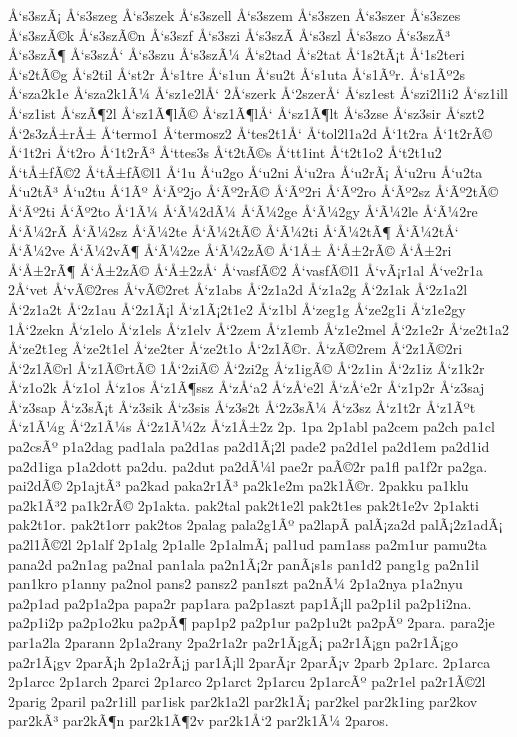 {Å‘s3szÃ¡
Å‘s3szeg
Å‘s3szek
Å‘s3szell
Å‘s3szem
Å‘s3szen
Å‘s3szer
Å‘s3szes
Å‘s3szÃ©k
Å‘s3szÃ©n
Å‘s3szf
Å‘s3szi
Å‘s3szÃ­
Å‘s3szl
Å‘s3szo
Å‘s3szÃ³
Å‘s3szÃ¶
Å‘s3szÅ‘
Å‘s3szu
Å‘s3szÃ¼
Å‘s2tad
Å‘s2tat
Å‘1s2tÃ¡t
Å‘1s2teri
Å‘s2tÃ©g
Å‘s2til
Å‘st2r
Å‘s1tre
Å‘s1un
Å‘su2t
Å‘s1uta
Å‘s1Ãºr.
Å‘s1Ãº2s
Å‘sza2k1e
Å‘sza2k1Ã¼
Å‘sz1e2lÅ‘
2Å‘szerk
Å‘2szerÅ‘
Å‘sz1est
Å‘szi2l1i2
Å‘sz1ill
Å‘sz1ist
Å‘szÃ¶2l
Å‘sz1Ã¶lÃ©
Å‘sz1Ã¶lÅ‘
Å‘sz1Ã¶lt
Å‘s3zse
Å‘sz3sir
Å‘szt2
Å‘2s3zÅ±rÅ±
Å‘termo1
Å‘termosz2
Å‘tes2t1Å‘
Å‘tol2l1a2d
Å‘1t2ra
Å‘1t2rÃ©
Å‘1t2ri
Å‘t2ro
Å‘1t2rÃ³
Å‘ttes3s
Å‘t2tÃ©s
Å‘tt1int
Å‘t2t1o2
Å‘t2t1u2
Å‘tÅ±fÃ©2
Å‘tÅ±fÃ©l1
Å‘1u
Å‘u2go
Å‘u2ni
Å‘u2ra
Å‘u2rÃ¡
Å‘u2ru
Å‘u2ta
Å‘u2tÃ³
Å‘u2tu
Å‘1Ãº
Å‘Ãº2jo
Å‘Ãº2rÃ©
Å‘Ãº2ri
Å‘Ãº2ro
Å‘Ãº2sz
Å‘Ãº2tÃ©
Å‘Ãº2ti
Å‘Ãº2to
Å‘1Ã¼
Å‘Ã¼2dÃ¼
Å‘Ã¼2ge
Å‘Ã¼2gy
Å‘Ã¼2le
Å‘Ã¼2re
Å‘Ã¼2rÃ­
Å‘Ã¼2sz
Å‘Ã¼2te
Å‘Ã¼2tÃ©
Å‘Ã¼2ti
Å‘Ã¼2tÃ¶
Å‘Ã¼2tÅ‘
Å‘Ã¼2ve
Å‘Ã¼2vÃ¶
Å‘Ã¼2ze
Å‘Ã¼2zÃ©
Å‘1Å±
Å‘Å±2rÃ©
Å‘Å±2ri
Å‘Å±2rÃ¶
Å‘Å±2zÃ©
Å‘Å±2zÅ‘
Å‘vasfÃ©2
Å‘vasfÃ©l1
Å‘vÃ¡r1al
Å‘ve2r1a
2Å‘vet
Å‘vÃ©2res
Å‘vÃ©2ret
Å‘z1abs
Å‘2z1a2d
Å‘z1a2g
Å‘2z1ak
Å‘2z1a2l
Å‘2z1a2t
Å‘2z1au
Å‘2z1Ã¡l
Å‘z1Ã¡2t1e2
Å‘z1bl
Å‘zeg1g
Å‘ze2g1i
Å‘z1e2gy
1Å‘2zekn
Å‘z1elo
Å‘z1els
Å‘z1elv
Å‘2zem
Å‘z1emb
Å‘z1e2mel
Å‘2z1e2r
Å‘ze2t1a2
Å‘ze2t1eg
Å‘ze2t1el
Å‘ze2ter
Å‘ze2t1o
Å‘2z1Ã©r.
Å‘zÃ©2rem
Å‘2z1Ã©2ri
Å‘2z1Ã©rl
Å‘z1Ã©rtÃ©
1Å‘2ziÃ©
Å‘2zi2g
Å‘z1igÃ©
Å‘2z1in
Å‘2z1iz
Å‘z1k2r
Å‘z1o2k
Å‘z1ol
Å‘z1os
Å‘z1Ã¶ssz
Å‘zÅ‘a2
Å‘zÅ‘e2l
Å‘zÅ‘e2r
Å‘z1p2r
Å‘z3saj
Å‘z3sap
Å‘z3sÃ¡t
Å‘z3sik
Å‘z3sis
Å‘z3s2t
Å‘2z3sÃ¼
Å‘z3sz
Å‘z1t2r
Å‘z1Ãºt
Å‘z1Ã¼g
Å‘2z1Ã¼s
Å‘2z1Ã¼2z
Å‘z1Å±2z
2p.
1pa
2p1abl
pa2cem
pa2ch
pa1cl
pa2csÃº
p1a2dag
pad1ala
pa2d1as
pa2d1Ã¡2l
pade2
pa2d1el
pa2d1em
pa2d1id
pa2d1iga
p1a2dott
pa2du.
pa2dut
pa2dÃ¼l
pae2r
paÃ©2r
pa1fl
pa1f2r
pa2ga.
pai2dÃ©
2p1ajtÃ³
pa2kad
paka2r1Ã³
pa2k1e2m
pa2k1Ã©r.
2pakku
pa1klu
pa2k1Ã³2
pa1k2rÃ©
2p1akta.
pak2tal
pak2t1e2l
pak2t1es
pak2t1e2v
2p1akti
pak2t1or.
pak2t1orr
pak2tos
2palag
pala2g1Ãº
pa2lapÃ­
palÃ¡za2d
palÃ¡2z1adÃ¡
pa2l1Ã©2l
2p1alf
2p1alg
2p1alle
2p1almÃ¡
pal1ud
pam1ass
pa2m1ur
pamu2ta
pana2d
pa2n1ag
pa2nal
pan1ala
pa2n1Ã¡2r
panÃ¡s1s
pan1d2
pang1g
pa2n1il
pan1kro
p1anny
pa2nol
pans2
pansz2
pan1szt
pa2nÃ¼
2p1a2nya
p1a2nyu
pa2p1ad
pa2p1a2pa
papa2r
pap1ara
pa2p1aszt
pap1Ã¡ll
pa2p1il
pa2p1i2na.
pa2p1i2p
pa2p1o2ku
pa2pÃ¶
pap1p2
pa2p1ur
pa2p1u2t
pa2pÃº
2para.
para2je
par1a2la
2parann
2p1a2rany
2pa2r1a2r
pa2r1Ã¡gÃ¡
pa2r1Ã¡gn
pa2r1Ã¡go
pa2r1Ã¡gv
2parÃ¡h
2p1a2rÃ¡j
par1Ã¡ll
2parÃ¡r
2parÃ¡v
2parb
2p1arc.
2p1arca
2p1arcc
2p1arch
2parci
2p1arco
2p1arct
2p1arcu
2p1arcÃº
pa2r1el
pa2r1Ã©2l
2parig
2paril
pa2r1ill
par1isk
par2k1a2l
par2k1Ã¡
par2kel
par2k1ing
par2kov
par2kÃ³
par2kÃ¶n
par2k1Ã¶2v
par2k1Å‘2
par2k1Ã¼
2paros.
}
